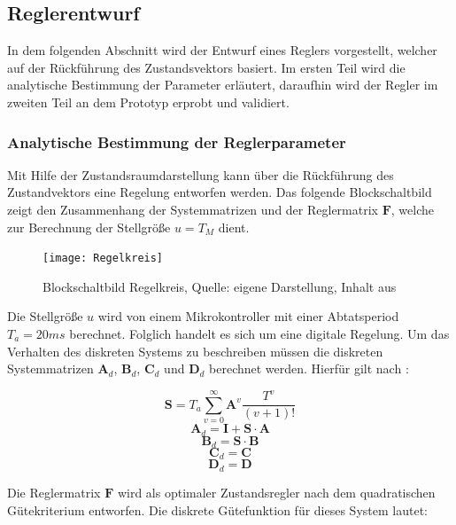 \subsection{Reglerentwurf}
In dem folgenden Abschnitt wird der Entwurf eines Reglers vorgestellt, welcher auf der Rückführung des Zustandsvektors basiert. Im ersten Teil wird die analytische Bestimmung der Parameter erläutert, daraufhin wird der Regler im zweiten Teil an dem Prototyp erprobt und validiert.

\subsubsection{Analytische Bestimmung der Reglerparameter}
Mit Hilfe der Zustandsraumdarstellung kann über die Rückführung des Zustandvektors eine Regelung entworfen werden. Das folgende Blockschaltbild zeigt den Zusammenhang der Systemmatrizen und der Reglermatrix $\textbf{F}$, welche zur Berechnung der Stellgröße $u=T_M$ dient.

\begin{figure}[h]
\label{Regelkreis_pic}
\texttt{[image: Regelkreis]}
\caption{Blockschaltbild Regelkreis, Quelle: eigene Darstellung, Inhalt aus \cite{RT2}}
\end{figure}

Die Stellgröße $u$ wird von einem Mikrokontroller mit einer Abtatsperiod $T_a = 20ms$ berechnet. Folglich handelt es sich um eine digitale Regelung. Um das Verhalten des diskreten Systems zu beschreiben müssen die diskreten Systemmatrizen $\textbf{A}_d$, $\textbf{B}_d$, $\textbf{C}_d$ und $\textbf{D}_d$ berechnet werden. Hierfür gilt nach \cite{RT2}:

\begin{equation}
\textbf{S} = T_a \sum_{v=0}^{\infty} \textbf{A}^v \frac{T^v}{(v+1)!}
\end{equation}
\begin{equation}
\textbf{A}_d = \textbf{I} + \textbf{S} \cdot \textbf{A}
\end{equation}
\begin{equation}
\textbf{B}_d = \textbf{S} \cdot \textbf{B}
\end{equation}
\begin{equation}
\textbf{C}_d = \textbf{C}
\end{equation}
\begin{equation}
\textbf{D}_d = \textbf{D}
\end{equation}

Die Reglermatrix $\textbf{F}$ wird als optimaler Zustandsregler nach dem quadratischen Gütekriterium entworfen. Die diskrete Gütefunktion für dieses System lautet:

